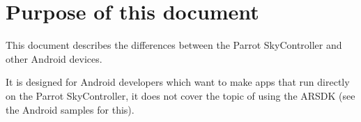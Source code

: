 \section*{Purpose of this document}

This document describes the differences between the Parrot SkyController and other Android devices.

It is designed for Android developers which want to make apps that run directly on the Parrot SkyController, it does not cover the topic of using the ARSDK (see the Android samples for this).


